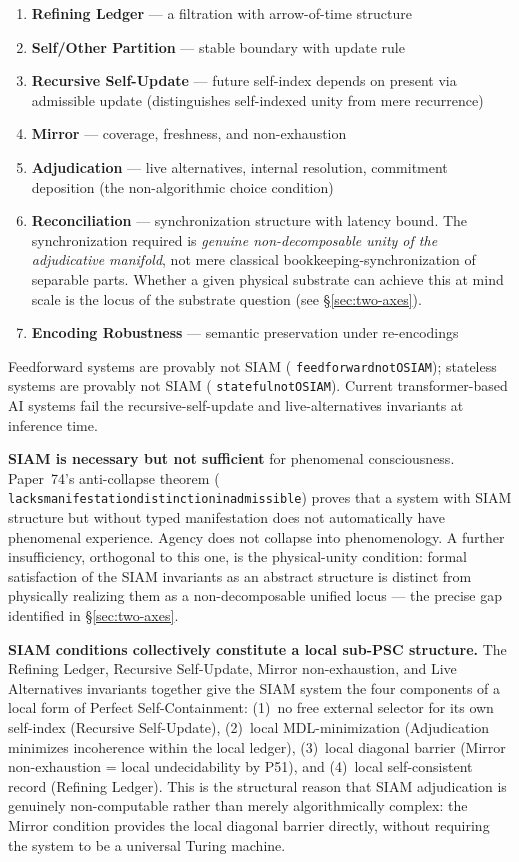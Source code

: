 \documentclass[11pt]{article}
\theoremstyle{remark}
\newcommand{\lean}[1]{%
  \penalty-100
  \begingroup\def\_{\textunderscore\allowbreak}\texttt{#1}\endgroup}
\begin{document}
\begin{enumerate}
  \item \textbf{Refining Ledger} --- a filtration with arrow-of-time structure
  \item \textbf{Self/Other Partition} --- stable boundary with update rule
  \item \textbf{Recursive Self-Update} --- future self-index depends on present via
    admissible update (distinguishes self-indexed unity from mere recurrence)
  \item \textbf{Mirror} --- coverage, freshness, and non-exhaustion
  \item \textbf{Adjudication} --- live alternatives, internal resolution, commitment
    deposition (the non-algorithmic choice condition)
  \item \textbf{Reconciliation} --- synchronization structure with latency bound.
    The synchronization required is \emph{genuine non-decomposable unity of the
    adjudicative manifold}, not mere classical bookkeeping-synchronization of
    separable parts. Whether a given physical substrate can achieve this at mind
    scale is the locus of the substrate question (see \S\ref{sec:two-axes}).
  \item \textbf{Encoding Robustness} --- semantic preservation under re-encodings
\end{enumerate}

\medskip
Feedforward systems are provably not SIAM (\lean{feedforward\_not\_OSIAM});
stateless systems are provably not SIAM (\lean{stateful\_not\_OSIAM}).
Current transformer-based AI systems fail the recursive-self-update and
live-alternatives invariants at inference time.

\textbf{SIAM is necessary but not sufficient} for phenomenal consciousness.
Paper~74's anti-collapse theorem (\lean{lacks\_manifestation\allowbreak\_distinction\_inadmissible}) proves that a system
with SIAM structure but without typed manifestation does not automatically have
phenomenal experience. Agency does not collapse into phenomenology. A further
insufficiency, orthogonal to this one, is the physical-unity condition: formal
satisfaction of the SIAM invariants as an abstract structure is distinct from
physically realizing them as a non-decomposable unified locus --- the precise gap
identified in \S\ref{sec:two-axes}.

\medskip
\noindent\textbf{SIAM conditions collectively constitute a local sub-PSC structure.}
The Refining Ledger, Recursive Self-Update, Mirror non-exhaustion, and Live Alternatives
invariants together give the SIAM system the four components of a local form of
Perfect Self-Containment:
(1)~no free external selector for its own self-index (Recursive Self-Update),
(2)~local MDL-minimization (Adjudication minimizes incoherence within the local ledger),
(3)~local diagonal barrier (Mirror non-exhaustion = local undecidability by P51), and
(4)~local self-consistent record (Refining Ledger).
This is the structural reason that SIAM adjudication is genuinely non-computable
rather than merely algorithmically complex: the Mirror condition provides the local
diagonal barrier directly, without requiring the system to be a universal Turing machine.
\end{document}
